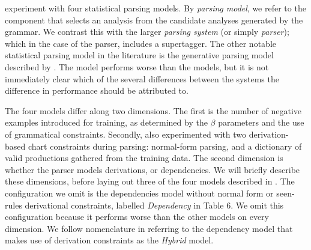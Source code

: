 \citet{clark:cl07} experiment with four statistical parsing models. By
\emph{parsing model}, we refer to the component that selects an analysis from
the candidate analyses generated by the grammar. We contrast this with the
larger \emph{parsing system} (or simply \emph{parser}); which in the case of the
\candc parser, includes a supertagger.  The other notable \ccg statistical
parsing model in the literature is the generative parsing model described by
\citet{hock:acl03}. The \citeauthor{hock:acl03} model performs worse than the
\citeauthor{clark:cl07} models, but it is not immediately clear which of the
several differences between the systems the difference in performance should be
attributed to.

The four \citeauthor{clark:cl07} models differ along two dimensions. The first
is the number of negative examples introduced for training, as determined by the
$\beta$ parameters and the use of grammatical constraints.
Secondly, \citeauthor{clark:cl07} also experimented with two derivation-based
chart constraints during parsing: \citet{eisner:96} normal-form parsing, and a
dictionary of valid productions gathered from the training data.
The second dimension is whether the parser models derivations, or
dependencies. We will briefly describe these dimensions, before laying out three
of the four models described in \citet{clark:cl07}. The configuration we omit is
the dependencies model without normal form or seen-rules derivational
constraints, labelled \emph{Dependency} in \citet{clark:cl07} Table 6. We omit
this configuration because it performs worse than the other models on every
dimension. We follow  nomenclature in referring to the
dependency model that makes use of derivation constraints as the \emph{Hybrid}
model.


